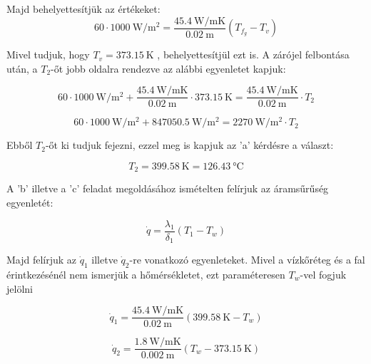 Majd behelyettesítjük az értékeket:
\begin{equation}
60 \cdot \SI{1000}{\watt\per\meter^2} =  \frac{\SI{45.4}{\watt\per\meter\kelvin}}{\SI{0.02}{\meter}} (T_f_g - T_v)
\end{equation}

Mivel tudjuk, hogy $T_v = \SI{373.15}{\kelvin}$ , behelyettesítjül ezt is.
A zárójel felbontása után, a $T_2$-őt jobb oldalra rendezve az alábbi egyenletet kapjuk:

\begin{equation}
60 \cdot \SI{1000}{\watt\per\meter^2}+  \frac{\SI{45.4}{\watt\per\meter\kelvin}}{\SI{0.02}{\meter}} \cdot \SI{373.15}{\kelvin}=  \frac{\SI{45.4}{\watt\per\meter\kelvin}}{\SI{0.02}{\meter}} \cdot T_2
\end{equation}

\begin{equation}
60 \cdot \SI{1000}{\watt\per\meter^2} + \SI{847050.5}{\watt\per\meter^2} = \SI{2270}{\watt\per\meter^2} \cdot T_2
\end{equation}
\vspace{1mm}

Ebből $T_2$-őt ki tudjuk fejezni, ezzel meg is kapjuk az 'a' kérdésre a választ:

\begin{equation}
T_2 = \SI{399.58}{\kelvin} = \SI{126.43}{\celsius}
\end{equation}

\vspace{1mm}


A 'b' illetve a 'c' feladat megoldásához ismételten felírjuk az áramsűrűség egyenletét:

\begin{equation}
	 \dot{q} = \frac{\lambda_1}{\delta_1} (T_1 - T_w)
\end{equation}

Majd felírjuk az $\dot{q}_1$ illetve $\dot{q}_2$-re vonatkozó egyenleteket. Mivel a vízkőréteg és a fal érintkezésénél nem ismerjük a hőmérsékletet, ezt paraméteresen $T_w$-vel fogjuk jelölni

\begin{equation}
	 \dot{q}_1 =  \frac{\SI{45.4}{\watt\per\meter\kelvin}}{\SI{0.02}{\meter}} (\SI{399.58}{\kelvin} - T_w)
\end{equation}


\begin{equation}
	 \dot{q}_2 =  \frac{\SI{1.8}{\watt\per\meter\kelvin}}{\SI{0.002}{\meter}} (T_w - \SI{373.15}{\kelvin})
\end{equation}

